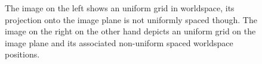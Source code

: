 \begin{figure}[h]
\centering
{}
\caption{The image on the left shows an uniform grid in worldspace,
its projection onto the image plane is not uniformly spaced though.
The image on the right on the other hand depicts an uniform grid on
the image plane and its associated non-uniform spaced worldspace
positions.}
\label{fig:projectedgrid}
\end{figure}


